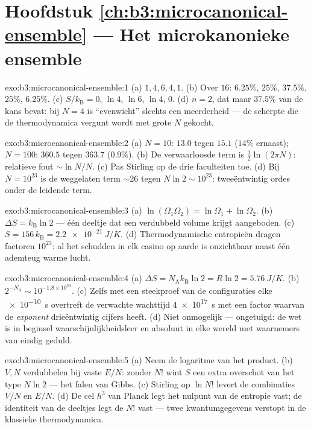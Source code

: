 \section*{Hoofdstuk \ref{ch:b3:microcanonical-ensemble} --- Het microkanonieke ensemble}

\begin{solution}{exo:b3:microcanonical-ensemble:1}
(a) $1, 4, 6, 4, 1$. (b) Over $16$: $6.25\%$, $25\%$, $37.5\%$,
$25\%$, $6.25\%$. (c) $S/k_{\text{B}} = 0$, $\ln4$, $\ln6$, $\ln4$,
$0$. (d) $n = 2$, dat maar $37.5\%$ van de kans bevat: bij $N = 4$ is
``evenwicht'' slechts een meerderheid --- de scherpte die de
thermodynamica vergunt wordt met grote $N$ gekocht.
\end{solution}

\begin{solution}{exo:b3:microcanonical-ensemble:2}
(a) $N = 10$: $13.0$ tegen $15.1$ ($14\%$ ernaast); $N = 100$:
$360.5$ tegen $363.7$ ($0.9\%$). (b) De verwaarloosde term is
$\tfrac12\ln(2\pi N)$: relatieve fout $\sim\ln N/N$. (c) Pas Stirling op
de drie faculteiten toe. (d) Bij $N = 10^{23}$ is de weggelaten term
$\sim26$ tegen $N\ln2 \sim 10^{23}$: tweeëntwintig ordes onder de leidende
term.
\end{solution}

\begin{solution}{exo:b3:microcanonical-ensemble:3}
(a) $\ln(\Omega_1\Omega_2) = \ln\Omega_1 + \ln\Omega_2$. (b)
$\Delta S = k_{\text{B}}\ln2$ --- één deeltje dat een verdubbeld volume
krijgt aangeboden. (c) $S = 156\,k_{\text{B}} = \qty{2.2e-21}{J/K}$. (d)
Thermodynamische entropieën dragen factoren $10^{23}$: al het schudden in
elk casino op aarde is onzichtbaar naast één ademteug warme lucht.
\end{solution}

\begin{solution}{exo:b3:microcanonical-ensemble:4}
(a) $\Delta S = N_{\text{A}}k_{\text{B}}\ln2 = R\ln2 =
\qty{5.76}{J/K}$. (b) $2^{-N_{\text{A}}} \sim 10^{-1.8\times
10^{23}}$. (c) Zelfs met een steekproef van de configuraties elke
\qty{e-10}{s} overtreft de verwachte wachttijd \qty{4e17}{s} met een
factor waarvan de \emph{exponent} drieëntwintig cijfers heeft. (d) Niet
onmogelijk --- ongetuigd: de wet is in beginsel waarschijnlijkheidsleer en
absoluut in elke wereld met waarnemers van eindig geduld.
\end{solution}

\begin{solution}{exo:b3:microcanonical-ensemble:5}
(a) Neem de logaritme van het product. (b) $V, N$ verdubbelen bij
vaste $E/N$: zonder $N!$ wint $S$ een extra overschot van het type
$N\ln2$ --- het falen van Gibbs. (c) Stirling op $\ln N!$ levert de
combinaties $V/N$ en $E/N$. (d) De cel $h^3$ van Planck legt het nulpunt
van de entropie vast; de identiteit van de deeltjes legt de $N!$ vast ---
twee kwantumgegevens verstopt in de klassieke thermodynamica.
\end{solution}

